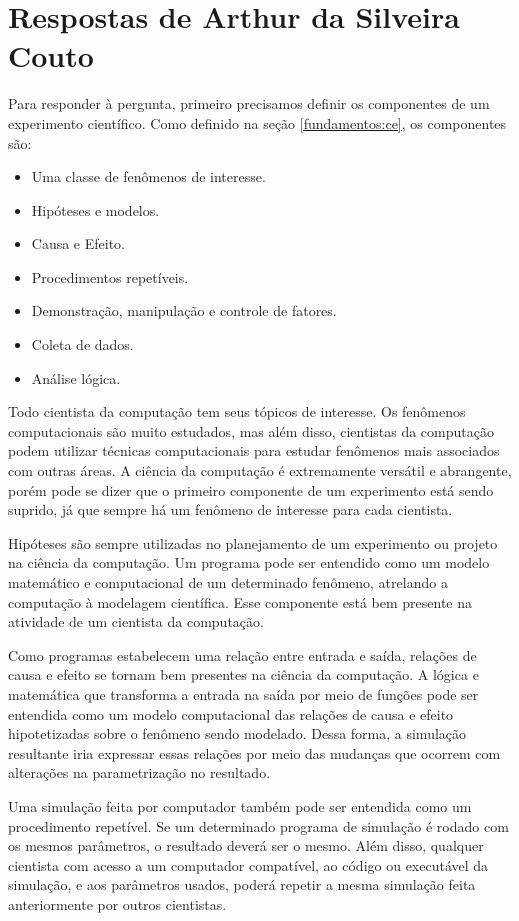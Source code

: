 \section{Respostas de Arthur da Silveira Couto}

Para responder à pergunta, primeiro precisamos definir os componentes de um experimento científico. Como definido na seção \ref{fundamentos:ce}, os componentes são:
\begin{itemize}
    \item Uma classe de fenômenos de interesse.
    \item Hipóteses e modelos.
    \item Causa e Efeito.
    \item Procedimentos repetíveis.
    \item Demonstração, manipulação e controle de fatores.
    \item Coleta de dados.
    \item Análise lógica.
\end{itemize}

Todo cientista da computação tem seus tópicos de interesse. Os fenômenos computacionais são muito estudados, mas além disso, cientistas da computação podem utilizar técnicas computacionais para estudar fenômenos mais associados com outras áreas. A ciência da computação é extremamente versátil e abrangente, porém pode se dizer que o primeiro componente de um experimento está sendo suprido, já que sempre há um fenômeno de interesse para cada cientista.

Hipóteses são sempre utilizadas no planejamento de um experimento ou projeto na ciência da computação. Um programa pode ser entendido como um modelo matemático e computacional de um determinado fenômeno, atrelando a computação à modelagem científica. Esse componente está bem presente na atividade de um cientista da computação.

Como programas estabelecem uma relação entre entrada e saída, relações de causa e efeito se tornam bem presentes na ciência da computação. A lógica e matemática que transforma a entrada na saída por meio de funções pode ser entendida como um modelo computacional das relações de causa e efeito hipotetizadas sobre o fenômeno sendo modelado. Dessa forma, a simulação resultante iria expressar essas relações por meio das mudanças que ocorrem com alterações na parametrização no resultado.

Uma simulação feita por computador também pode ser entendida como um procedimento repetível. Se um determinado programa de simulação é rodado com os mesmos parâmetros, o resultado deverá ser o mesmo. Além disso, qualquer cientista com acesso a um computador compatível, ao código ou executável da simulação, e aos parâmetros usados, poderá repetir a mesma simulação feita anteriormente por outros cientistas.

